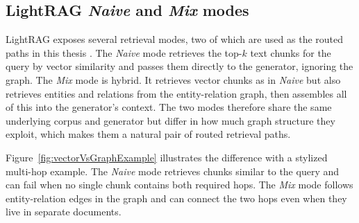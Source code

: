 \documentclass[english, bibtex]{kththesis}               %
\numberwithin{listing}{chapter}
\begin{document}
\subsection{LightRAG \emph{Naive} and \emph{Mix} modes}
\label{sec:backgroundLightragModes}

LightRAG exposes several retrieval modes, two of which are used as the routed paths in this thesis \cite{lightrag2024}. The \emph{Naive} mode retrieves the top-\(k\) text chunks for the query by vector similarity and passes them directly to the generator, ignoring the graph. The \emph{Mix} mode is hybrid. It retrieves vector chunks as in \emph{Naive} but also retrieves entities and relations from the entity-relation graph, then assembles all of this into the generator's context. The two modes therefore share the same underlying corpus and generator but differ in how much graph structure they exploit, which makes them a natural pair of routed retrieval paths.

Figure~\ref{fig:vectorVsGraphExample} illustrates the difference with a stylized multi-hop example. The \emph{Naive} mode retrieves chunks similar to the query and can fail when no single chunk contains both required hops. The \emph{Mix} mode follows entity-relation edges in the graph and can connect the two hops even when they live in separate documents.
\end{document}
